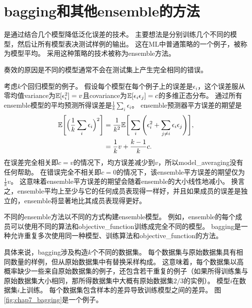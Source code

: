 \section{\gls{bagging}和其他\gls{ensemble}的方法}
\label{sec:bagging_and_other_ensemble_methods}
是通过结合几个模型降低泛化误差的技术\citep{ML:Breiman:bagging}。
主要想法是分别训练几个不同的模型，然后让所有模型表决测试样例的输出。
这在\gls{ML}中普通策略的一个例子，被称为模型平均。
采用这种策略的技术被称为\gls{ensemble}方法。

奏效的原因是不同的模型通常不会在测试集上产生完全相同的错误。

考虑$k$个回归模型的例子。
假设每个模型在每个例子上的误差是$\epsilon_i$，这个误差服从零均值\gls{variance}为$\mathbb{E}[\epsilon_i^2] = v$且\gls{covariance}为$\mathbb{E}[\epsilon_i \epsilon_j] = c$的多维正态分布。
通过所有\gls{ensemble}模型的平均预测所得误差是$\frac{1}{k} \sum_i \epsilon_i$。 
\gls{ensemble}预测器平方误差的期望是
\begin{align}
 \mathbb{E} \Bigg[\Big(\frac{1}{k} \sum_i \epsilon_i \Big)^2\Bigg] &= \frac{1}{k^2} 
 \mathbb{E} \Bigg[\sum_i \Bigg(\epsilon_i^2 + \sum_{j \neq i} \epsilon_i \epsilon_j\Bigg)\Bigg], \\
&= \frac{1}{k} v + \frac{k-1}{k} c .                             
\end{align}
在误差完全相关即$c=v$的情况下，均方误差减少到$v$，所以\gls{model_averaging}没有任何帮助。
在错误完全不相关即$c =0$的情况下，该\gls{ensemble}平方误差的期望仅为$\frac{1}{k}v$。
这意味着\gls{ensemble}平方误差的期望会随着\gls{ensemble}的大小线性地减小。
换言之，\gls{ensemble}平均上至少与它的任何成员表现得一样好，并且如果成员的误差是独立的，\gls{ensemble}将显著地比其成员表现得更好。

不同的\gls{ensemble}方法以不同的方式构建\gls{ensemble}模型。
例如，\gls{ensemble}的每个成员可以使用不同的算法和\gls{objective_function}训练成完全不同的模型。
\gls{bagging}是一种允许重复多次使用同一种模型、训练算法和\gls{objective_function}的方法。


具体来说，\gls{bagging}涉及构造$k$个不同的数据集。
每个数据集与原始数据集具有相同数量的样例，但从原始数据集中有替换采样构成。
这意味着，每个数据集以高概率缺少一些来自原始数据集的例子，还包含若干重复的例子（如果所得训练集与原始数据集大小相同，那所得数据集中大概有原始数据集$2/3$的实例）。
模型$i$在数据集$i$上训练。
每个数据集包含样本的差异导致训练模型之间的差异。
图\ref{fig:chap7_bagging}是一个例子。


